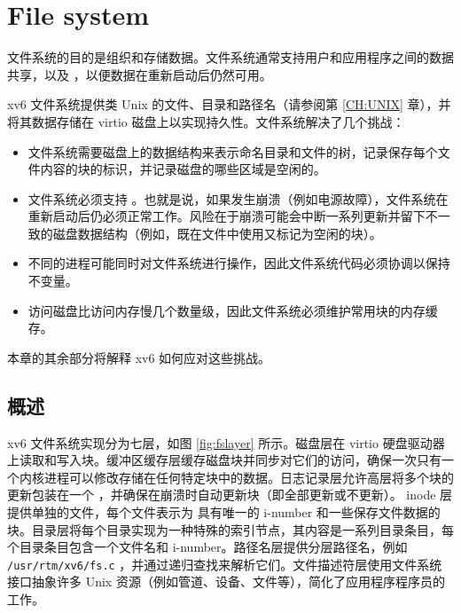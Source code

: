
   \chapter{File system}   
    \label{CH:FS}     

文件系统的目的是组织和存储数据。文件系统通常支持用户和应用程序之间的数据共享，以及
       ，以便数据在重新启动后仍然可用。  

xv6 文件系统提供类 Unix 的文件、目录和路径名（请参阅第    \ref{CH:UNIX}    章），并将其数据存储在 virtio 磁盘上以实现持久性。文件系统解决了几个挑战：
    \begin{itemize}

 
   \item   文件系统需要磁盘上的数据结构来表示命名目录和文件的树，记录保存每个文件内容的块的标识，并记录磁盘的哪些区域是空闲的。   \item   文件系统必须支持
        。也就是说，如果发生崩溃（例如电源故障），文件系统在重新启动后仍必须正常工作。风险在于崩溃可能会中断一系列更新并留下不一致的磁盘数据结构（例如，既在文件中使用又标记为空闲的块）。   \item   不同的进程可能同时对文件系统进行操作，因此文件系统代码必须协调以保持不变量。   \item   访问磁盘比访问内存慢几个数量级，因此文件系统必须维护常用块的内存缓存。  \end{itemize}     

本章的其余部分将解释 xv6 如何应对这些挑战。
    \section{概述  }     

xv6 文件系统实现分为七层，如图    \ref{fig:fslayer}    所示。磁盘层在 virtio 硬盘驱动器上读取和写入块。缓冲区缓存层缓存磁盘块并同步对它们的访问，确保一次只有一个内核进程可以修改存储在任何特定块中的数据。日志记录层允许高层将多个块的更新包装在一个
        ，并确保在崩溃时自动更新块（即全部更新或不更新）。 inode 层提供单独的文件，每个文件表示为
        具有唯一的 i-number 和一些保存文件数据的块。目录层将每个目录实现为一种特殊的索引节点，其内容是一系列目录条目，每个目录条目包含一个文件名和 i-number。路径名层提供分层路径名，例如
    \lstinline{/usr/rtm/xv6/fs.c}    ，并通过递归查找来解析它们。文件描述符层使用文件系统接口抽象许多 Unix 资源（例如管道、设备、文件等），简化了应用程序程序员的工作。  

